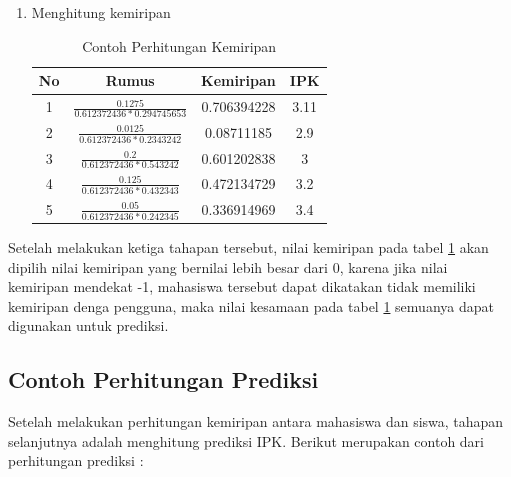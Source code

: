 \begin{enumerate}
        \item Menghitung kemiripan \\
            \begin{table}[H]
                \centering
                \renewcommand{\arraystretch}{1.5}
                \begin{tabular}{|c|c|c|c|}
                    \hline
                    No & Rumus & Kemiripan & IPK \\ 
                    \hline
                    1 & $\frac{0.1275}{0.612372436*0.294745653}$ & 0.706394228 & 3.11\\
                    \hline
                    2 & $\frac{0.0125}{0.612372436*0.2343242}$ & 0.08711185 & 2.9 \\
                    \hline
                    3 & $\frac{0.2}{0.612372436*0.543242}$ & 0.601202838 & 3 \\
                    \hline
                    4 & $\frac{0.125}{0.612372436*0.432343}$ & 0.472134729 & 3.2\\
                    \hline
                    5 & $\frac{0.05}{0.612372436*0.242345}$ & 0.336914969 & 3.4\\
                    \hline
                \end{tabular}
                \caption{Contoh Perhitungan Kemiripan}
                \label{tab:kemiripan}
            \end{table}
\end{enumerate}

Setelah melakukan ketiga tahapan tersebut, nilai kemiripan pada tabel \ref{tab:kemiripan} akan dipilih nilai kemiripan yang bernilai lebih besar dari 0, karena jika nilai kemiripan mendekat -1, mahasiswa tersebut dapat dikatakan tidak memiliki kemiripan denga pengguna,  maka nilai kesamaan pada tabel \ref{tab:kemiripan} semuanya dapat digunakan untuk prediksi.


\subsection{Contoh Perhitungan Prediksi}
\label{subsec:contoh perhitungan prediksi}

Setelah melakukan perhitungan kemiripan antara mahasiswa dan siswa, tahapan selanjutnya adalah menghitung prediksi IPK. Berikut merupakan contoh dari perhitungan prediksi :

